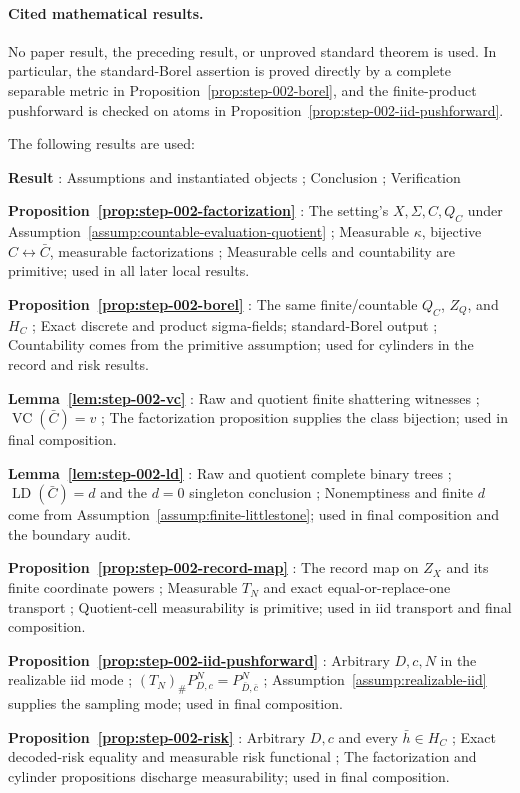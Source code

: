 \paragraph{Cited mathematical results.}


No paper result, the preceding result, or unproved standard theorem is
used. In particular, the standard-Borel assertion is proved directly by a
complete separable metric in Proposition~\ref{prop:step-002-borel}, and the
finite-product pushforward is checked on atoms in
Proposition~\ref{prop:step-002-iid-pushforward}.

The following results are used:

\noindent\textbf{ Result }:  Assumptions and instantiated objects ;  Conclusion ;  Verification \par
\noindent\textbf{ Proposition~\ref{prop:step-002-factorization} }:  The setting's \(X,\Sigma,C,Q_C\) under Assumption~\ref{assump:countable-evaluation-quotient} ;  Measurable \(\kappa\), bijective \(C\leftrightarrow\bar C\), measurable factorizations ;  Measurable cells and countability are primitive; used in all later local results. \par
\noindent\textbf{ Proposition~\ref{prop:step-002-borel} }:  The same finite/countable \(Q_C\), \(Z_Q\), and \(H_C\) ;  Exact discrete and product sigma-fields; standard-Borel output ;  Countability comes from the primitive assumption; used for cylinders in the record and risk results. \par
\noindent\textbf{ Lemma~\ref{lem:step-002-vc} }:  Raw and quotient finite shattering witnesses ;  \(\operatorname{VC}(\bar C)=v\) ;  The factorization proposition supplies the class bijection; used in final composition. \par
\noindent\textbf{ Lemma~\ref{lem:step-002-ld} }:  Raw and quotient complete binary trees ;  \(\operatorname{LD}(\bar C)=d\) and the \(d=0\) singleton conclusion ;  Nonemptiness and finite \(d\) come from Assumption~\ref{assump:finite-littlestone}; used in final composition and the boundary audit. \par
\noindent\textbf{ Proposition~\ref{prop:step-002-record-map} }:  The record map on \(Z_X\) and its finite coordinate powers ;  Measurable \(T_N\) and exact equal-or-replace-one transport ;  Quotient-cell measurability is primitive; used in iid transport and final composition. \par
\noindent\textbf{ Proposition~\ref{prop:step-002-iid-pushforward} }:  Arbitrary \(D,c,N\) in the realizable iid mode ;  \((T_N)_\#P_{D,c}^N=P_{\bar D,\bar c}^N\) ;  Assumption~\ref{assump:realizable-iid} supplies the sampling mode; used in final composition. \par
\noindent\textbf{ Proposition~\ref{prop:step-002-risk} }:  Arbitrary \(D,c\) and every \(\bar h\in H_C\) ;  Exact decoded-risk equality and measurable risk functional ;  The factorization and cylinder propositions discharge measurability; used in final composition. \par




